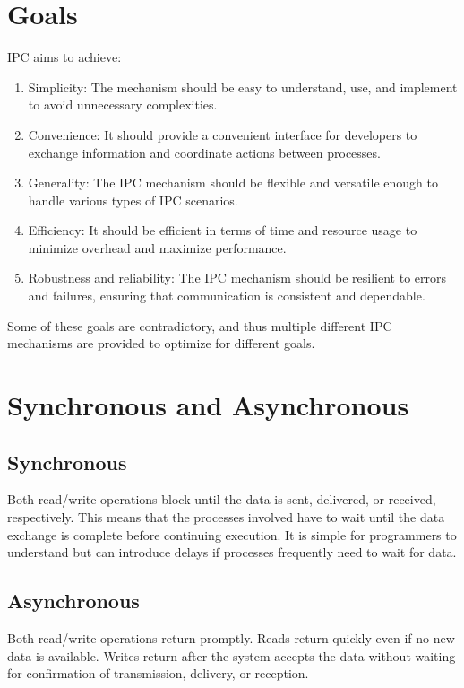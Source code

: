 \documentclass{report}
\begin{document}
\section{Goals}
IPC aims to achieve:

\begin{enumerate}[label=\textit{(\roman*)}]
\item Simplicity: The mechanism should be easy to understand, use, and implement to avoid
  unnecessary complexities.
\item Convenience: It should provide a convenient interface for developers to exchange information
  and coordinate actions between processes.
\item Generality: The IPC mechanism should be flexible and versatile enough to handle various types
  of IPC scenarios.
\item Efficiency: It should be efficient in terms of time and resource usage to minimize overhead
  and maximize performance.
\item Robustness and reliability: The IPC mechanism should be resilient to errors and failures,
  ensuring that communication is consistent and dependable.
\end{enumerate}
Some of these goals are contradictory, and thus multiple different IPC mechanisms are provided to
optimize for different goals.


\section{Synchronous and Asynchronous}
\subsection{Synchronous}
Both read/write operations block until the data is sent, delivered, or received, respectively. This
means that the processes involved have to wait until the data exchange is complete before continuing
execution. It is simple for programmers to understand but can introduce delays if processes
frequently need to wait for data.


\subsection{Asynchronous}
Both read/write operations return promptly. Reads return quickly even if no new data is
available. Writes return after the system accepts the data without waiting for confirmation of
transmission, delivery, or reception.
\end{document}
